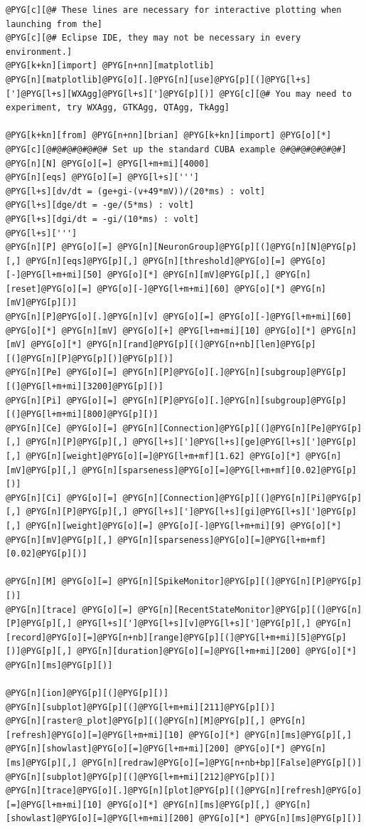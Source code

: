 \documentclass[letterpaper,10pt,english]{manual}
\begin{document}
\begin{Verbatim}[commandchars=@\[\]]
@PYG[c][@# These lines are necessary for interactive plotting when launching from the]
@PYG[c][@# Eclipse IDE, they may not be necessary in every environment.]
@PYG[k+kn][import] @PYG[n+nn][matplotlib]
@PYG[n][matplotlib]@PYG[o][.]@PYG[n][use]@PYG[p][(]@PYG[l+s][']@PYG[l+s][WXAgg]@PYG[l+s][']@PYG[p][)] @PYG[c][@# You may need to experiment, try WXAgg, GTKAgg, QTAgg, TkAgg]

@PYG[k+kn][from] @PYG[n+nn][brian] @PYG[k+kn][import] @PYG[o][*]
@PYG[c][@#@#@#@#@#@# Set up the standard CUBA example @#@#@#@#@#@#]
@PYG[n][N] @PYG[o][=] @PYG[l+m+mi][4000]
@PYG[n][eqs] @PYG[o][=] @PYG[l+s][''']
@PYG[l+s][dv/dt = (ge+gi-(v+49*mV))/(20*ms) : volt]
@PYG[l+s][dge/dt = -ge/(5*ms) : volt]
@PYG[l+s][dgi/dt = -gi/(10*ms) : volt]
@PYG[l+s][''']
@PYG[n][P] @PYG[o][=] @PYG[n][NeuronGroup]@PYG[p][(]@PYG[n][N]@PYG[p][,] @PYG[n][eqs]@PYG[p][,] @PYG[n][threshold]@PYG[o][=] @PYG[o][-]@PYG[l+m+mi][50] @PYG[o][*] @PYG[n][mV]@PYG[p][,] @PYG[n][reset]@PYG[o][=] @PYG[o][-]@PYG[l+m+mi][60] @PYG[o][*] @PYG[n][mV]@PYG[p][)]
@PYG[n][P]@PYG[o][.]@PYG[n][v] @PYG[o][=] @PYG[o][-]@PYG[l+m+mi][60] @PYG[o][*] @PYG[n][mV] @PYG[o][+] @PYG[l+m+mi][10] @PYG[o][*] @PYG[n][mV] @PYG[o][*] @PYG[n][rand]@PYG[p][(]@PYG[n+nb][len]@PYG[p][(]@PYG[n][P]@PYG[p][)]@PYG[p][)]
@PYG[n][Pe] @PYG[o][=] @PYG[n][P]@PYG[o][.]@PYG[n][subgroup]@PYG[p][(]@PYG[l+m+mi][3200]@PYG[p][)]
@PYG[n][Pi] @PYG[o][=] @PYG[n][P]@PYG[o][.]@PYG[n][subgroup]@PYG[p][(]@PYG[l+m+mi][800]@PYG[p][)]
@PYG[n][Ce] @PYG[o][=] @PYG[n][Connection]@PYG[p][(]@PYG[n][Pe]@PYG[p][,] @PYG[n][P]@PYG[p][,] @PYG[l+s][']@PYG[l+s][ge]@PYG[l+s][']@PYG[p][,] @PYG[n][weight]@PYG[o][=]@PYG[l+m+mf][1.62] @PYG[o][*] @PYG[n][mV]@PYG[p][,] @PYG[n][sparseness]@PYG[o][=]@PYG[l+m+mf][0.02]@PYG[p][)]
@PYG[n][Ci] @PYG[o][=] @PYG[n][Connection]@PYG[p][(]@PYG[n][Pi]@PYG[p][,] @PYG[n][P]@PYG[p][,] @PYG[l+s][']@PYG[l+s][gi]@PYG[l+s][']@PYG[p][,] @PYG[n][weight]@PYG[o][=] @PYG[o][-]@PYG[l+m+mi][9] @PYG[o][*] @PYG[n][mV]@PYG[p][,] @PYG[n][sparseness]@PYG[o][=]@PYG[l+m+mf][0.02]@PYG[p][)]

@PYG[n][M] @PYG[o][=] @PYG[n][SpikeMonitor]@PYG[p][(]@PYG[n][P]@PYG[p][)]
@PYG[n][trace] @PYG[o][=] @PYG[n][RecentStateMonitor]@PYG[p][(]@PYG[n][P]@PYG[p][,] @PYG[l+s][']@PYG[l+s][v]@PYG[l+s][']@PYG[p][,] @PYG[n][record]@PYG[o][=]@PYG[n+nb][range]@PYG[p][(]@PYG[l+m+mi][5]@PYG[p][)]@PYG[p][,] @PYG[n][duration]@PYG[o][=]@PYG[l+m+mi][200] @PYG[o][*] @PYG[n][ms]@PYG[p][)]

@PYG[n][ion]@PYG[p][(]@PYG[p][)]
@PYG[n][subplot]@PYG[p][(]@PYG[l+m+mi][211]@PYG[p][)]
@PYG[n][raster@_plot]@PYG[p][(]@PYG[n][M]@PYG[p][,] @PYG[n][refresh]@PYG[o][=]@PYG[l+m+mi][10] @PYG[o][*] @PYG[n][ms]@PYG[p][,] @PYG[n][showlast]@PYG[o][=]@PYG[l+m+mi][200] @PYG[o][*] @PYG[n][ms]@PYG[p][,] @PYG[n][redraw]@PYG[o][=]@PYG[n+nb+bp][False]@PYG[p][)]
@PYG[n][subplot]@PYG[p][(]@PYG[l+m+mi][212]@PYG[p][)]
@PYG[n][trace]@PYG[o][.]@PYG[n][plot]@PYG[p][(]@PYG[n][refresh]@PYG[o][=]@PYG[l+m+mi][10] @PYG[o][*] @PYG[n][ms]@PYG[p][,] @PYG[n][showlast]@PYG[o][=]@PYG[l+m+mi][200] @PYG[o][*] @PYG[n][ms]@PYG[p][)]


\end{Verbatim}
\end{document}
